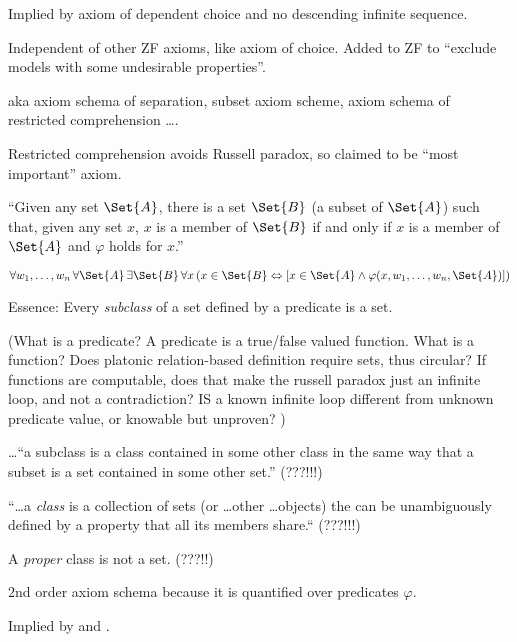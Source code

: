 Implied by axiom of dependent choice and 
no descending infinite sequence.

Independent of other \textsf{ZF} axioms, like axiom of choice.
Added to \textsf{ZF} to 
``exclude models with some undesirable properties''.

\label{sec:Axiom-schema-of-specification}

aka axiom schema of separation, subset axiom scheme,
axiom schema of restricted comprehension \ldots .

Restricted comprehension avoids Russell paradox,
so claimed to be ``most important'' axiom.

``Given any set $\Set{A}$, there is a set $\Set{B}$
 (a subset of $\Set{A}$) 
such that, given any set $x$, 
$x$ is a member of $\Set{B}$ if and only if $x$ 
is a member of $\Set{A}$ 
and $\varphi$ holds for $x$.''
\cite{wiki:Axiom_schema_of_specification}

${\displaystyle 
\forall w_{1},\ldots ,w_{n}\,
\forall \Set{A}\,\exists \Set{B}\,
\forall x\,
(x\in \Set{B}
\Leftrightarrow
[x\in \Set{A}\land \varphi (x,w_{1},\ldots ,w_{n},\Set{A})])}$

Essence:
Every \textsl{subclass}
of a set defined by a predicate is a set.

(What is a predicate?
A predicate is a true/false valued function.
What is a function? 
Does platonic relation-based definition require sets,
thus circular?
If functions are computable, does that make the
russell paradox just an infinite loop,
and not a contradiction?
IS a known infinite loop different from 
unknown predicate value, or knowable but unproven?
)

\ldots``a subclass is a class contained in some other class in 
the same way that a subset is a set contained in some other set.''
\cite{wiki:Subclass_set_theory}
(???!!!)

``\dots a \textsl{class} is a collection of sets 
(or \ldots other \ldots objects)
the can be unambiguously defined by a property 
that all its members share.``\cite{wiki:Class_set_theory}
(???!!!)

A \textsl{proper} class is not a set. (???!!)

$2$nd order axiom schema because it is quantified over predicates
 $\varphi$.

Implied by 
and \cite{wiki:Axiom_of_empty_set}.

